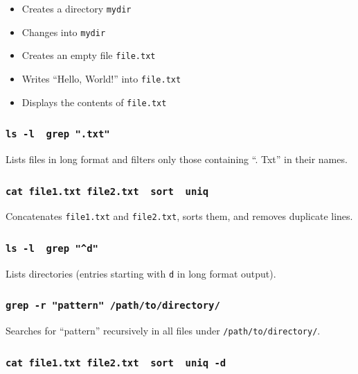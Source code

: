\begin{itemize}
\tightlist
\item
  Creates a directory \texttt{mydir}
\item
  Changes into \texttt{mydir}
\item
  Creates an empty file \texttt{file.txt}
\item
  Writes ``Hello, World!'' into \texttt{file.txt}
\item
  Displays the contents of \texttt{file.txt}
\end{itemize}

\subsubsection{\texorpdfstring{\texttt{ls\ -l\ \textbar{}\ grep\ ".txt"}}{ls -l \textbar{} grep ".txt"}}\label{ls--l-grep-.txt}

Lists files in long format and filters only those containing ``. Txt''
in their names.

\subsubsection{\texorpdfstring{\texttt{cat\ file1.txt\ file2.txt\ \textbar{}\ sort\ \textbar{}\ uniq}}{cat file1.txt file2.txt \textbar{} sort \textbar{} uniq}}\label{cat-file1.txt-file2.txt-sort-uniq}

Concatenates \texttt{file1.txt} and \texttt{file2.txt}, sorts them, and
removes duplicate lines.

\subsubsection{\texorpdfstring{\texttt{ls\ -l\ \textbar{}\ grep\ "\^{}d"}}{ls -l \textbar{} grep "\^{}d"}}\label{ls--l-grep-d}

Lists directories (entries starting with \texttt{d} in long format
output).

\subsubsection{\texorpdfstring{\texttt{grep\ -r\ "pattern"\ /path/to/directory/}}{grep -r "pattern" /path/to/directory/}}\label{grep--r-pattern-pathtodirectory}

Searches for ``pattern'' recursively in all files under
\texttt{/path/to/directory/}.

\subsubsection{\texorpdfstring{\texttt{cat\ file1.txt\ file2.txt\ \textbar{}\ sort\ \textbar{}\ uniq\ -d}}{cat file1.txt file2.txt \textbar{} sort \textbar{} uniq -d}}\label{cat-file1.txt-file2.txt-sort-uniq--d}

